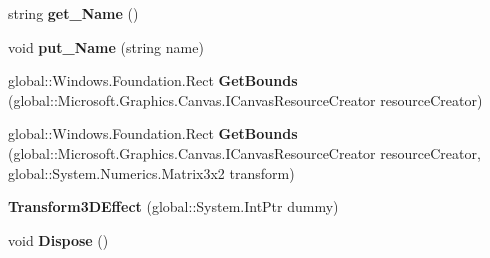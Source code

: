 \begin{DoxyCompactItemize}
\item 
\mbox{\label{class_microsoft_1_1_graphics_1_1_canvas_1_1_effects_1_1_transform3_d_effect_abeb49b0cd72d2a8a1ee087855183220b}} 
string {\bfseries get\+\_\+\+Name} ()
\item 
\mbox{\label{class_microsoft_1_1_graphics_1_1_canvas_1_1_effects_1_1_transform3_d_effect_aee37d65325d885f638ac7db9a43f1363}} 
void {\bfseries put\+\_\+\+Name} (string name)
\item 
\mbox{\label{class_microsoft_1_1_graphics_1_1_canvas_1_1_effects_1_1_transform3_d_effect_ae3e5b20ce4cd94f594d9b50fc74ee771}} 
global\+::\+Windows.\+Foundation.\+Rect {\bfseries Get\+Bounds} (global\+::\+Microsoft.\+Graphics.\+Canvas.\+I\+Canvas\+Resource\+Creator resource\+Creator)
\item 
\mbox{\label{class_microsoft_1_1_graphics_1_1_canvas_1_1_effects_1_1_transform3_d_effect_a9e9d12b267f452ee3aa3b6b19363d355}} 
global\+::\+Windows.\+Foundation.\+Rect {\bfseries Get\+Bounds} (global\+::\+Microsoft.\+Graphics.\+Canvas.\+I\+Canvas\+Resource\+Creator resource\+Creator, global\+::\+System.\+Numerics.\+Matrix3x2 transform)
\item 
\mbox{\label{class_microsoft_1_1_graphics_1_1_canvas_1_1_effects_1_1_transform3_d_effect_af7099edb8f0d394bed7b6d387eb4c183}} 
{\bfseries Transform3\+D\+Effect} (global\+::\+System.\+Int\+Ptr dummy)
\item 
\mbox{\label{class_microsoft_1_1_graphics_1_1_canvas_1_1_effects_1_1_transform3_d_effect_a9623fd7e2c02c46327c72133773725c1}} 
void {\bfseries Dispose} ()
\item 
\mbox{\label{class_microsoft_1_1_graphics_1_1_canvas_1_1_effects_1_1_transform3_d_effect_a92c6d9ac604d9adcc898ee36205ad9bd}} 

\end{DoxyCompactItemize}

